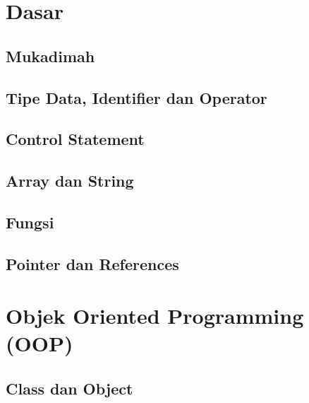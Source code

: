 \documentclass[11pt,b5paper,oneside,titlepage]{book}
\begin{document}
\part{Dasar}

	\chapter{Mukadimah}\label{mukadimah}
	
	
	\chapter{Tipe Data, Identifier dan Operator}
	
	
	\chapter{Control Statement}
	
	
	\chapter{Array dan String}\label{array-dan-string}
	
	
	\chapter{Fungsi}
	
	
	\chapter{Pointer dan References}\label{pointer-dan-references}
	

	\part{Objek Oriented Programming (OOP)}

	\chapter{Class dan Object}\label{class-dan-object}
	
	
\end{document}
